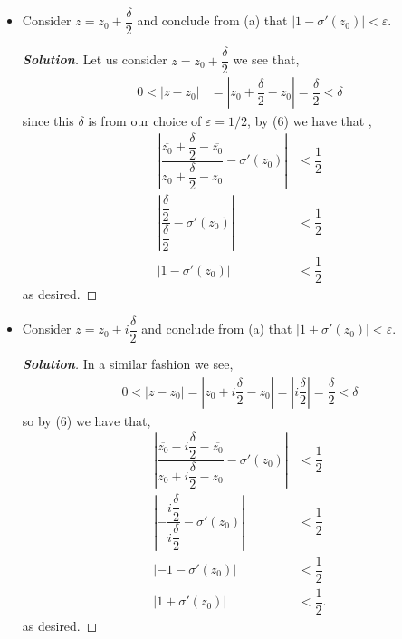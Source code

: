 \documentclass[11pt]{article}
\newenvironment{problem}[2][Problem\!]{\begin{trivlist}
\item[\hskip \labelsep {\bfseries #1}\hskip \labelsep {\bfseries #2}]}{\end{trivlist}}
\newenvironment{solution}{\begin{proof}[\textbf{\textit{Solution}}] }{\end{proof}}
\newcommand{\abs}[1]{\left\lvert#1\right\rvert} %
\renewcommand{\epsilon}{\varepsilon}
\begin{document}
\begin{problem}{3.6}
\begin{itemize}[itemsep=3em]
\item[(ii)] Consider $z = z_0 + \dfrac{\delta}{2}$ and conclude from (a) that $\abs{1 - \sigma'(z_0)} < \epsilon$.
\begin{solution}
  Let us consider $z = z_0 + \dfrac{\delta}{2}$ we see that,
  \begin{align*}
    0< \abs{z -z_0}  &= \abs{z_0 + \dfrac{\delta}{2} - z_0} = \dfrac{\delta}{2} < \delta 
  \end{align*}
  since this $\delta$ is from our choice of $\epsilon = 1/2$, by (6) we have that ,
  \begin{align*}
    \abs{ \dfrac{ \overline{z_0} +\dfrac{\delta}{2} -\overline{z_0}}{ z_0 + \dfrac{\delta}{2} - z_0 }  - \sigma'(z_0)} &< \dfrac{1}{2} \\
    \abs{\dfrac{\dfrac{\delta}{2}}{\dfrac{\delta}{2}} - \sigma'(z_0)}&< \dfrac{1}{2} \\
    \abs{1 - \sigma'(z_0)} &< \dfrac{1}{2}
  \end{align*}
  as desired.
  
\end{solution}

\item[(iii)] Consider $z = z_0 + i\dfrac{\delta}{2}$ and conclude from (a) that $\abs{1 + \sigma'(z_0)} < \epsilon$.
\begin{solution}
In a similar fashion we see,
\begin{align*}
  0 < \abs{z - z_0} = \abs{z_0 +i\dfrac{\delta}{2} -z_0} = \abs{i\dfrac{\delta}{2}} = \dfrac{\delta}{2} < \delta
\end{align*}
so by (6) we have that,
\begin{align*}
  \abs{ \dfrac{\overline{z_0} -i\dfrac{\delta}{2} - \overline{z_0}}{z_0+ i\dfrac{\delta}{2} - z_0 } - \sigma'(z_0)} &< \dfrac{1}{2} \\
  \abs{ -\dfrac{i\dfrac{\delta}{2} }{ i\dfrac{\delta}{2}} - \sigma'(z_0) } &< \dfrac{1}{2} \\
  \abs{-1 - \sigma'(z_0)} &< \dfrac{1}{2} \\
  \abs{1 + \sigma'(z_0)} &< \dfrac{1}{2}.
\end{align*}
as desired. 
\end{solution}


\end{itemize}
\end{problem}
\end{document}
